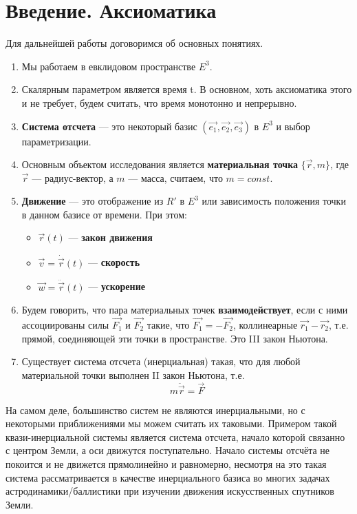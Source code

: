\section{Введение. Аксиоматика}

Для дальнейшей работы договоримся об основных понятиях.\\

\begin{enumerate}
    \item Мы работаем в евклидовом пространстве $E^3$.
    \item Скалярным параметром является время t. В основном, хоть аксиоматика этого и не требует, будем считать, что время монотонно и непрерывно.
    \item \textbf{Система отсчета} --- это некоторый базис $(\vec{e_1}, \vec{e_2}, \vec{e_3})$ в $E^3$ и выбор параметризации.
    \item Основным объектом исследования является \textbf{материальная точка} $\{\vec{r}, m\}$, где $\vec{r}$ --- радиус-вектор, а $m$ --- масса, считаем, что $m = const$.
    \item \textbf{Движение} --- это отображение из $R'$ в $E^3$ или зависимость положения точки в данном базисе от времени. При этом:
    \begin{itemize}
        \item $\vec{r}(t)$ --- \textbf{закон движения}
        \item $\vec{v} = \dot{\vec{r}}(t)$ --- \textbf{скорость}
        \item $\vec{w} = \ddot{\vec{r}}(t)$ --- \textbf{ускорение}
    \end{itemize}
    \item Будем говорить, что пара материальных точек \textbf{взаимодействует}, если с ними ассоциированы силы $\vec{F_1}$ и $\vec{F_2}$ такие, что $\vec{F_1} = -\vec{F_2}$, коллинеарные $\vec{r_1} - \vec{r_2}$, т.е. прямой, соединяющей эти точки в пространстве. Это III закон Ньютона.
    \item Существует система отсчета (инерциальная) такая, что для любой материальной точки выполнен II закон Ньютона, т.е.
    \[
    m\ddot{\vec{r}} = \vec{F}
    \]
\end{enumerate}

На самом деле, большинство систем не являются инерциальными, но с некоторыми приближениями мы можем считать их таковыми. Примером такой квази-инерциальной системы является система отсчета, начало которой связанно с центром Земли, а оси движутся поступательно. Начало системы отсчёта не покоится и не движется прямолинейно и равномерно, несмотря на это такая система рассматривается в качестве инерциального базиса во многих задачах астродинамики/баллистики при изучении движения искусственных спутников Земли.

